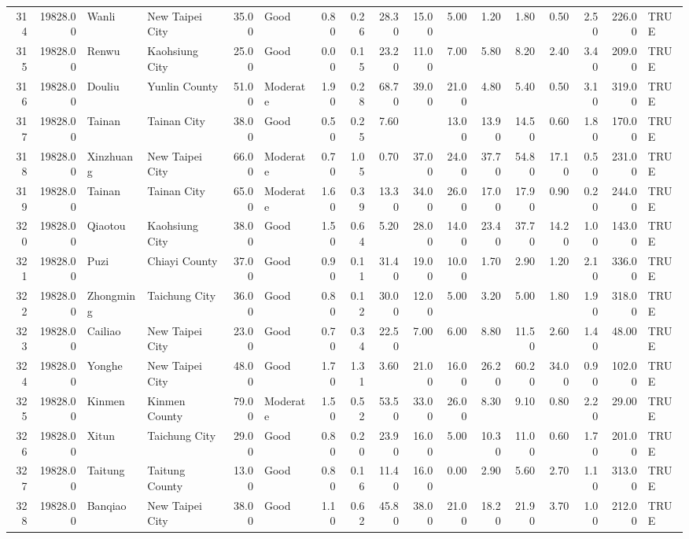 \begin{table}[ht]
\begin{tabular}{rrllrlrrrrrrrrrrl}
  314 & 19828.00 & Wanli & New Taipei City & 35.00 & Good & 0.80 & 0.26 & 28.30 & 15.00 & 5.00 & 1.20 & 1.80 & 0.50 & 2.50 & 226.00 & TRUE \\ 
  315 & 19828.00 & Renwu & Kaohsiung City & 25.00 & Good & 0.00 & 0.15 & 23.20 & 11.00 & 7.00 & 5.80 & 8.20 & 2.40 & 3.40 & 209.00 & TRUE \\ 
  316 & 19828.00 & Douliu & Yunlin County & 51.00 & Moderate & 1.90 & 0.28 & 68.70 & 39.00 & 21.00 & 4.80 & 5.40 & 0.50 & 3.10 & 319.00 & TRUE \\ 
  317 & 19828.00 & Tainan & Tainan City & 38.00 & Good & 0.50 & 0.25 & 7.60 &  & 13.00 & 13.90 & 14.50 & 0.60 & 1.80 & 170.00 & TRUE \\ 
  318 & 19828.00 & Xinzhuang & New Taipei City & 66.00 & Moderate & 0.70 & 1.05 & 0.70 & 37.00 & 24.00 & 37.70 & 54.80 & 17.10 & 0.50 & 231.00 & TRUE \\ 
  319 & 19828.00 & Tainan & Tainan City & 65.00 & Moderate & 1.60 & 0.39 & 13.30 & 34.00 & 26.00 & 17.00 & 17.90 & 0.90 & 0.20 & 244.00 & TRUE \\ 
  320 & 19828.00 & Qiaotou & Kaohsiung City & 38.00 & Good & 1.50 & 0.64 & 5.20 & 28.00 & 14.00 & 23.40 & 37.70 & 14.20 & 1.00 & 143.00 & TRUE \\ 
  321 & 19828.00 & Puzi & Chiayi County & 37.00 & Good & 0.90 & 0.11 & 31.40 & 19.00 & 10.00 & 1.70 & 2.90 & 1.20 & 2.10 & 336.00 & TRUE \\ 
  322 & 19828.00 & Zhongming & Taichung City & 36.00 & Good & 0.80 & 0.12 & 30.00 & 12.00 & 5.00 & 3.20 & 5.00 & 1.80 & 1.90 & 318.00 & TRUE \\ 
  323 & 19828.00 & Cailiao & New Taipei City & 23.00 & Good & 0.70 & 0.34 & 22.50 & 7.00 & 6.00 & 8.80 & 11.50 & 2.60 & 1.40 & 48.00 & TRUE \\ 
  324 & 19828.00 & Yonghe & New Taipei City & 48.00 & Good & 1.70 & 1.31 & 3.60 & 21.00 & 16.00 & 26.20 & 60.20 & 34.00 & 0.90 & 102.00 & TRUE \\ 
  325 & 19828.00 & Kinmen & Kinmen County & 79.00 & Moderate & 1.50 & 0.52 & 53.50 & 33.00 & 26.00 & 8.30 & 9.10 & 0.80 & 2.20 & 29.00 & TRUE \\ 
  326 & 19828.00 & Xitun & Taichung City & 29.00 & Good & 0.80 & 0.20 & 23.90 & 16.00 & 5.00 & 10.30 & 11.00 & 0.60 & 1.70 & 201.00 & TRUE \\ 
  327 & 19828.00 & Taitung & Taitung County & 13.00 & Good & 0.80 & 0.16 & 11.40 & 16.00 & 0.00 & 2.90 & 5.60 & 2.70 & 1.10 & 313.00 & TRUE \\ 
  328 & 19828.00 & Banqiao & New Taipei City & 38.00 & Good & 1.10 & 0.62 & 45.80 & 38.00 & 21.00 & 18.20 & 21.90 & 3.70 & 1.00 & 212.00 & TRUE \\ 

\end{tabular}
\end{table}
